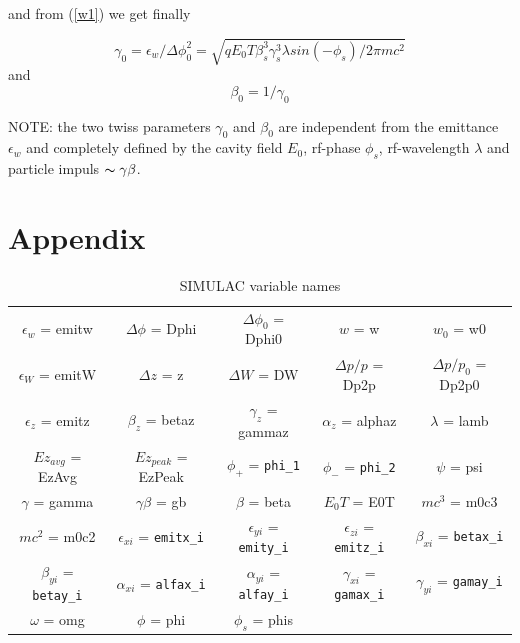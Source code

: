 \documentclass{article}
\begin{document}
and from (\ref{w1}) we get finally

\begin{equation}
\gamma_{0} = \epsilon_{w}/\Delta\phi_{0}^{2} = \sqrt{qE_{0}T\beta_{s}^{3}\gamma_{s}^{3}\lambda sin(-\phi_{s})/2\pi mc^{2}} \label{} \end{equation}
and
\begin{equation}
\beta_{0} = 1/\gamma_{0} \label{}
\end{equation}

NOTE: the two twiss parameters $\gamma_{0}$ and $\beta_{0}$ are independent from the emittance $\epsilon_{w}$ and completely defined by the cavity field $E_{0}$, rf-phase $\phi_{s}$, rf-wavelength $\lambda$ and particle impuls $\thicksim\gamma\beta$.

\newpage
\section{Appendix}
\begin{table}[h]
\caption{SIMULAC variable names}
\centering
\begin{tabular}{ c c c c c }
\hline\hline
$\epsilon_{w}$ = emitw    &$\Delta\phi$ = Dphi       &$\Delta\phi_{0}$ = Dphi0    &$w$ = w                &$w_{0}$ = w0 \\
$\epsilon_{W}$ = emitW    &$\Delta z$ = z            &$\Delta W$ = DW             &$\Delta p/p$ = Dp2p    &$\Delta p/p_0$ = Dp2p0 \\
$\epsilon_{z}$ = emitz    &$\beta_{z}$ = betaz       &$\gamma_z$ = gammaz         &$\alpha_z$ = alphaz    &$\lambda$ = lamb \\
$Ez_{avg}$ = EzAvg        &$Ez_{peak}$ = EzPeak      &$\phi_{+}$ = \verb'phi_1'   &$\phi_{-}$ = \verb'phi_2'   &$\psi$ = psi \\
$\gamma$ = gamma          &$\gamma\beta$ = gb        &$\beta$ = beta              &$E_0T$ = E0T           &$mc^3$ = m0c3 \\

$mc^2$ = m0c2       &$\epsilon_{xi}$ = \verb'emitx_i'  &$\epsilon_{yi}$ = \verb'emity_i'  &$\epsilon_{zi}$ = \verb'emitz_i'  &$\beta_{xi}$  = \verb'betax_i' \\
$\beta_{yi}$ = \verb'betay_i' &$\alpha_{xi}$   = \verb'alfax_i'  &$\alpha_{yi}$   = \verb'alfay_i'  &$\gamma_{xi}$   = \verb'gamax_i'  &$\gamma_{yi}$ = \verb'gamay_i'  \\
$\omega$ = omg           &$\phi$ = phi               &$\phi_{s}$ = phis 
\end{tabular}
\end{table}
\end{document}
